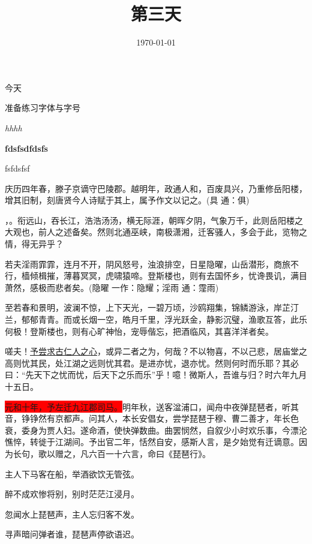 \documentclass{article}
\title{第三天}
\date{\today}
\begin{document}
\maketitle
\begin{center}
{\Huge
\lishu

今天}准备练习字体与字号
\end{center}
\par
\itshape
hhhh\par
\bfseries
fdsfsdfdsfs\par
\sffamily
fsfdsfsf \par

庆历四年春，滕子京谪守巴陵郡。越明年，政通人和，百废具兴，乃重修岳阳楼，增其旧制，刻唐贤今人诗赋于其上，属予作文以记之。(具 通：俱)

，。衔远山，吞长江，浩浩汤汤，横无际涯，朝晖夕阴，气象万千，此则岳阳楼之大观也，前人之述备矣。然则北通巫峡，南极潇湘，迁客骚人，多会于此，览物之情，得无异乎？

若夫淫雨霏霏，连月不开，阴风怒号，浊浪排空，日星隐曜，山岳潜形，商旅不行，樯倾楫摧，薄暮冥冥，虎啸猿啼。登斯楼也，则有去国怀乡，忧谗畏讥，满目萧然，感极而悲者矣。(隐曜 一作：隐耀；淫雨 通：霪雨)

{\lishu
至若春和景明，波澜不惊，上下天光，一碧万顷，沙鸥翔集，锦鳞游泳，岸芷汀兰，郁郁青青。而或长烟一空，皓月千里，浮光跃金，静影沉璧，渔歌互答，此乐何极！登斯楼也，则有心旷神怡，宠辱偕忘，把酒临风，其喜洋洋者矣。}

嗟夫！\uline{予尝求古仁人之心}，或异二者之为，何哉？不以物喜，不以己悲，居庙堂之高则忧其民，处江湖之远则忧其君。是进亦忧，退亦忧。然则何时而乐耶？其必曰：“先天下之忧而忧，后天下之乐而乐”乎！噫！微斯人，吾谁与归？时六年九月十五日。  

\colorbox{red}{元和十年，予左迁九江郡司马。}明年秋，送客湓浦口，闻舟中夜弹琵琶者，听其音，铮铮然有京都声。问其人，本长安倡女，尝学琵琶于穆、曹二善才，年长色衰，委身为贾人妇。遂命酒，使快弹数\colorbox[rgb]{0.5,0.5,0.9}{曲。曲罢悯然，自叙少}小时欢乐事，今漂沦憔悴，转徙于江湖间。予出官二年，恬然自安，感斯人言，是夕始觉有迁谪意。因为长句，歌以赠之，凡六百一十六言，命曰《琵琶行》。

主人下马客在船，举酒欲饮无管弦。\par 
醉不成欢惨将别，别时茫茫江浸月。\par
忽闻水上琵琶声，主人忘归客不发。\par

寻声暗问弹者谁，琵琶声停欲语迟。\par
\end{document}
